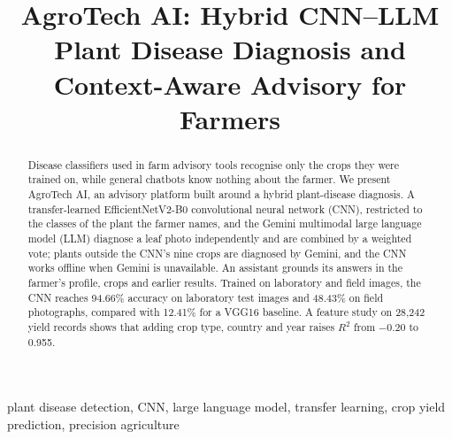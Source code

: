 \documentclass[conference]{IEEEtran}
\begin{document}
\title{AgroTech AI: Hybrid CNN--LLM Plant Disease Diagnosis and Context-Aware Advisory for Farmers}

\author{
\and
{}
\and
{}
\and
{}
\and
{}
}

\maketitle

\begin{abstract}
Disease classifiers used in farm advisory tools recognise only the crops they were trained on, while general chatbots know nothing about the farmer. We present AgroTech AI, an advisory platform built around a hybrid plant-disease diagnosis. A transfer-learned EfficientNetV2-B0 convolutional neural network (CNN), restricted to the classes of the plant the farmer names, and the Gemini multimodal large language model (LLM) diagnose a leaf photo independently and are combined by a weighted vote; plants outside the CNN's nine crops are diagnosed by Gemini, and the CNN works offline when Gemini is unavailable. An assistant grounds its answers in the farmer's profile, crops and earlier results. Trained on laboratory and field images, the CNN reaches 94.66\% accuracy on laboratory test images and 48.43\% on field photographs, compared with 12.41\% for a VGG16 baseline. A feature study on 28,242 yield records shows that adding crop type, country and year raises $R^2$ from $-0.20$ to 0.955.
\end{abstract}

\begin{IEEEkeywords}
plant disease detection, CNN, large language model, transfer learning, crop yield prediction, precision agriculture
\end{IEEEkeywords}
\end{document}
